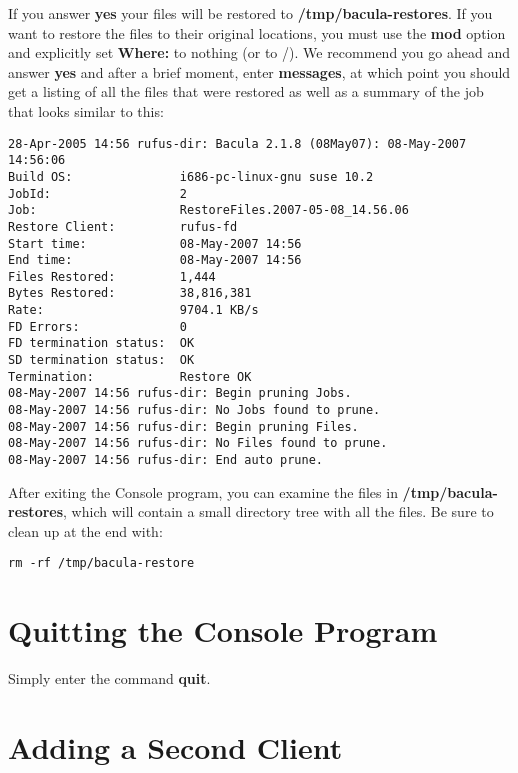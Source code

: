 If you answer {\bf yes} your files will be restored to {\bf
/tmp/bacula-restores}. If you want to restore the files to their original
locations, you must use the {\bf mod} option and explicitly set {\bf Where:}
to nothing (or to /). We recommend you go ahead and answer {\bf yes} and after
a brief moment, enter {\bf messages}, at which point you should get a listing
of all the files that were restored as well as a summary of the job that looks
similar to this: 

\footnotesize
\begin{verbatim}
28-Apr-2005 14:56 rufus-dir: Bacula 2.1.8 (08May07): 08-May-2007 14:56:06
Build OS:               i686-pc-linux-gnu suse 10.2
JobId:                  2
Job:                    RestoreFiles.2007-05-08_14.56.06
Restore Client:         rufus-fd
Start time:             08-May-2007 14:56
End time:               08-May-2007 14:56
Files Restored:         1,444
Bytes Restored:         38,816,381
Rate:                   9704.1 KB/s
FD Errors:              0
FD termination status:  OK
SD termination status:  OK
Termination:            Restore OK
08-May-2007 14:56 rufus-dir: Begin pruning Jobs.
08-May-2007 14:56 rufus-dir: No Jobs found to prune.
08-May-2007 14:56 rufus-dir: Begin pruning Files.
08-May-2007 14:56 rufus-dir: No Files found to prune.
08-May-2007 14:56 rufus-dir: End auto prune.
\end{verbatim}
\normalsize

After exiting the Console program, you can examine the files in {\bf
/tmp/bacula-restores}, which will contain a small directory tree with all the
files. Be sure to clean up at the end with: 

\footnotesize
\begin{verbatim}
rm -rf /tmp/bacula-restore
\end{verbatim}
\normalsize

\section{Quitting the Console Program}

Simply enter the command {\bf quit}. 
\label{SecondClient}

\section{Adding a Second Client}

